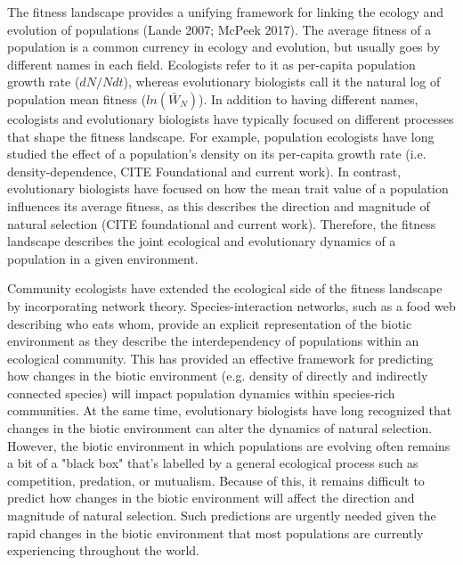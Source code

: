 \documentclass[11pt]{article}
\begin{document}

The fitness landscape provides a unifying framework for linking the ecology and evolution of populations (Lande 2007; McPeek 2017). The average fitness of a population is a common currency in ecology and evolution, but usually goes by different names in each field. Ecologists refer to it as per-capita population growth rate ($dN/Ndt$), whereas evolutionary biologists call it the natural log of population mean fitness ($ln(\bar W_N)$). In addition to having different names, ecologists and evolutionary biologists have typically focused on different processes that shape the fitness landscape. For example, population ecologists have long studied the effect of a population's density on its per-capita growth rate (i.e. density-dependence, CITE Foundational and current work). In contrast, evolutionary biologists have focused on how the mean trait value of a population influences its average fitness, as this describes the direction and magnitude of natural selection (CITE foundational and current work). Therefore, the fitness landscape describes the joint ecological and evolutionary dynamics of a population in a given environment.

Community ecologists have extended the ecological side of the fitness landscape by incorporating network theory. Species-interaction networks, such as a food web describing who eats whom, provide an explicit representation of the biotic environment as they describe the interdependency of populations within an ecological community. This has provided an effective framework for predicting how changes in the biotic environment (e.g. density of directly and indirectly connected species) will impact population dynamics within species-rich communities. At the same time, evolutionary biologists have long recognized that changes in the biotic environment can alter the dynamics of natural selection. However, the biotic environment in which populations are evolving often remains a bit of a "black box" that's labelled by a general ecological process such as competition, predation, or mutualism. Because of this, it remains difficult to predict how changes in the biotic environment will affect the direction and magnitude of natural selection. Such predictions are urgently needed given the rapid changes in the biotic environment that most populations are currently experiencing throughout the world. 
\end{document}
